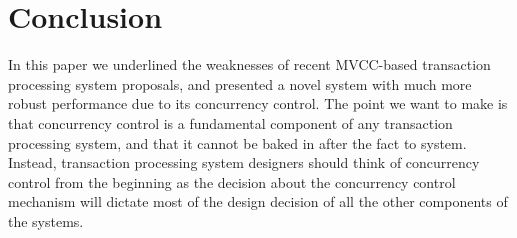 
\section{Conclusion }

In this paper we underlined the weaknesses of recent MVCC-based transaction processing system proposals, and presented a novel system with much more robust performance due to its concurrency control.
The point we want to make is that concurrency control is a fundamental component of any transaction processing system, and that it cannot be baked in after the fact to system. Instead, transaction processing system designers should think of concurrency control from the beginning as the decision about the concurrency control mechanism will dictate most of the design decision of all the other components of the systems. 

